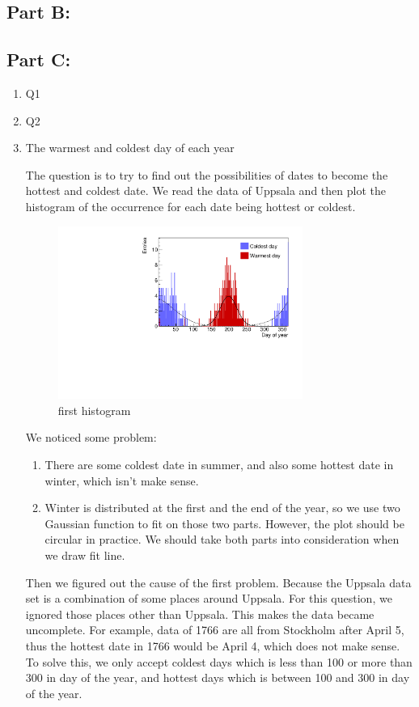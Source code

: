 \documentclass[a4paper]{article}
\begin{document}
\subsection{Part B:}
\subsection{Part C:}
\begin{enumerate}

\item Q1
\item Q2
\item The warmest and coldest day of each year

The question is to try to find out the possibilities of dates to become the hottest and coldest date. We read the data of Uppsala and then plot the histogram of the occurrence for each date being hottest or coldest. 

\begin{figure}[htp]
    \centering
    \includegraphics[width=8cm]{./images/hotCold_Upp_prev}
    \caption{first histogram}
    \label{fig:hist}
\end{figure}

We noticed some problem:
\begin{enumerate}
\item There are some coldest date in summer, and also some hottest date in winter, which isn't make sense.
\item Winter is distributed at the first and the end of the year, so we use two Gaussian function to fit on those two parts. However, the plot should be circular in practice. We should take both parts into consideration when we draw fit line.
\end{enumerate}
Then we figured out the cause of the first problem. Because the Uppsala data set is a combination of some places around Uppsala. For this question, we ignored those places other than Uppsala. This makes the data became uncomplete. For example, data of 1766 are all from Stockholm after April 5, thus the hottest date in 1766 would be April 4, which does not make sense. To solve this, we only accept coldest days which is less than 100 or more than 300 in day of the year, and hottest days which is between 100 and 300 in day of the year.





\end{enumerate}
\end{document}
